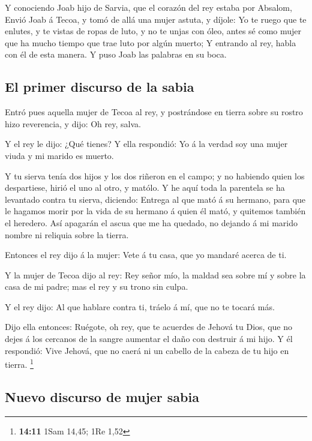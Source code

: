  Y conociendo Joab hijo de Sarvia, que el corazón del rey
estaba por Absalom,  Envió Joab á Tecoa, y tomó de allá una
mujer astuta, y díjole: Yo te ruego que te enlutes, y te vistas de ropas
de luto, y no te unjas con óleo, antes sé como mujer que ha mucho tiempo
que trae luto por algún muerto;  Y entrando al rey, habla
con él de esta manera. Y puso Joab las palabras en su boca.

\hypertarget{el-primer-discurso-de-la-sabia}{%
\subsection{El primer discurso de la
sabia}\label{el-primer-discurso-de-la-sabia}}

 Entró pues aquella mujer de Tecoa al rey, y postrándose en
tierra sobre su rostro hizo reverencia, y dijo: Oh rey, salva.

 Y el rey le dijo: ¿Qué tienes? Y ella respondió: Yo á la
verdad soy una mujer viuda y mi marido es muerto.

 Y tu sierva tenía dos hijos y los dos riñeron en el campo;
y no habiendo quien los despartiese, hirió el uno al otro, y matólo.
 Y he aquí toda la parentela se ha levantado contra tu
sierva, diciendo: Entrega al que mató á su hermano, para que le hagamos
morir por la vida de su hermano á quien él mató, y quitemos también el
heredero. Así apagarán el ascua que me ha quedado, no dejando á mi
marido nombre ni reliquia sobre la tierra.

 Entonces el rey dijo á la mujer: Vete á tu casa, que yo
mandaré acerca de ti.

 Y la mujer de Tecoa dijo al rey: Rey señor mío, la maldad
sea sobre mí y sobre la casa de mi padre; mas el rey y su trono sin
culpa.

 Y el rey dijo: Al que hablare contra ti, tráelo á mí, que
no te tocará más.

 Dijo ella entonces: Ruégote, oh rey, que te acuerdes de
Jehová tu Dios, que no dejes á los cercanos de la sangre aumentar el
daño con destruir á mi hijo. Y él respondió: Vive Jehová, que no caerá
ni un cabello de la cabeza de tu hijo en tierra. \footnote{\textbf{14:11}
  1Sam 14,45; 1Re 1,52}

\hypertarget{nuevo-discurso-de-mujer-sabia}{%
\subsection{Nuevo discurso de mujer
sabia}\label{nuevo-discurso-de-mujer-sabia}}

